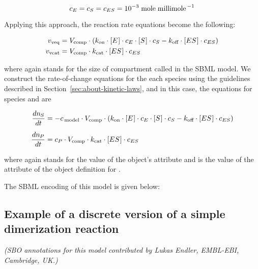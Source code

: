 \begin{linenomath}
  \begin{equation*}
      c_E = c_S = c_{ES} = 10^{-3} \; \text{mole} \; \text{millimole}^{\,-1}
  \end{equation*}
\end{linenomath}
Applying this approach, the reaction rate equations become the
following:
\begin{linenomath}
  \begin{align*}
    v_\text{veq}  & = V_\text{comp} \cdot (k_\text{on} \cdot [E\mkern1mu] \cdot c_E \cdot [S\mkern1mu] \cdot c_S
    - k_\text{off} \cdot [ES\mkern1mu] \cdot c_{ES})\\
    v_\text{vcat} & = V_\text{comp} \cdot k_\text{cat} \cdot [ES\mkern1mu] \cdot c_{ES}
  \end{align*}
\end{linenomath}
where again \Vcomp stands for the size of compartment called
 in the SBML model.  We construct the rate-of-change
equations for the each species using the guidelines described in
Section~\ref{sec:about-kinetic-laws}, and in this case, the
equations for species  and  are
\begin{linenomath}
  \begin{align*}
    \dfrac{d n_{\mkern-1muS}}{d t} & = - c_{\,\textrm{model}} \cdot V_\text{comp} \cdot
    (k_\text{on} \cdot [E\mkern1mu] \cdot c_E \cdot [S\mkern1mu] \cdot c_S
    - k_\text{off} \cdot [ES\mkern1mu] \cdot c_{ES}) \\[5pt]
    \dfrac{d n_{\mkern-1muP}}{d t} & = c_P \cdot V_\text{comp} \cdot k_\text{cat} \cdot [ES\mkern1mu] \cdot c_{ES}
  \end{align*}
\end{linenomath}
where again \csg stands for the value of the \Model object's
 attribute and \convP is the value of the
 attribute of the \Species object
definition for .

The SBML encoding of this model is given below:



\subsection{Example of a discrete version of a simple dimerization reaction}
\label{sec:discrete-eg}

\emph{(SBO annotations for this model contributed by Lukas Endler,
  EMBL-EBI, Cambridge, UK.)}

